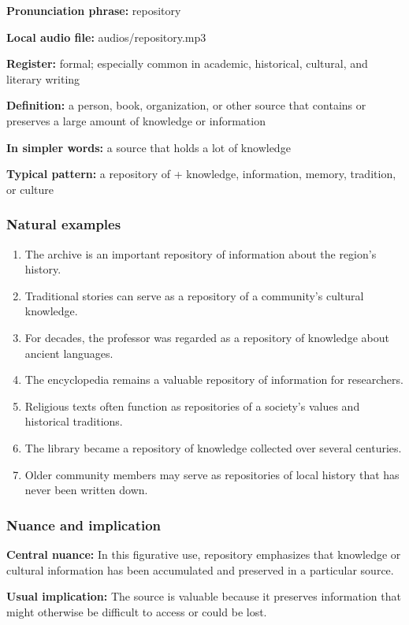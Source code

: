 \documentclass[11pt]{article}
\begin{document}
\textbf{Pronunciation phrase:} repository

\textbf{Local audio file:} audios/repository.mp3

\textbf{Register:} formal; especially common in academic, historical, cultural, and literary writing

\textbf{Definition:} a person, book, organization, or other source that contains or preserves a large amount of knowledge or information

\textbf{In simpler words:} a source that holds a lot of knowledge

\textbf{Typical pattern:} a repository of + knowledge, information, memory, tradition, or culture

\subsubsection{Natural examples}
\begin{enumerate}
  \item The archive is an important repository of information about the region's history.
  \item Traditional stories can serve as a repository of a community's cultural knowledge.
  \item For decades, the professor was regarded as a repository of knowledge about ancient languages.
  \item The encyclopedia remains a valuable repository of information for researchers.
  \item Religious texts often function as repositories of a society's values and historical traditions.
  \item The library became a repository of knowledge collected over several centuries.
  \item Older community members may serve as repositories of local history that has never been written down.
\end{enumerate}

\subsubsection{Nuance and implication}
\textbf{Central nuance:} In this figurative use, repository emphasizes that knowledge or cultural information has been accumulated and preserved in a particular source.

\textbf{Usual implication:} The source is valuable because it preserves information that might otherwise be difficult to access or could be lost.
\end{document}
